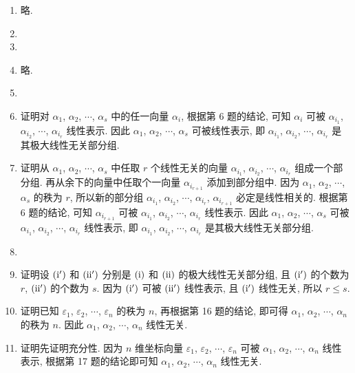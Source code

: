 \documentclass[a4paper, 11pt]{ctexart}
\begin{document}
\begin{enumerate}
        \item %
            略.
        \item %
        \item %
        \item %
            略.
        \item %
        \item %
            {\heiti 证明}\quad 对 $\alpha_1$, $\alpha_2$, $\cdots$, $\alpha_s$ 中的任一向量 $\alpha_i$, 根据{\heiti 第 6 题}的结论, 可知 $\alpha_i$ 可被 $\alpha_{i_1}$, $\alpha_{i_2}$, $\cdots$, $\alpha_{i_r}$ 线性表示.
            因此 $\alpha_1$, $\alpha_2$, $\cdots$, $\alpha_s$ 可被线性表示, 即 $\alpha_{i_1}$, $\alpha_{i_2}$, $\cdots$, $\alpha_{i_r}$ 是其极大线性无关部分组.
        \item %
            {\heiti 证明}\quad 从 $\alpha_1$, $\alpha_2$, $\cdots$, $\alpha_s$ 中任取 $r$ 个线性无关的向量 $\alpha_{i_1}$, $\alpha_{i_2}$, $\cdots$, $\alpha_{i_r}$ 组成一个部分组.
            再从余下的向量中任取个一向量 $\alpha_{i_{r+1}}$ 添加到部分组中. 因为 $\alpha_1$, $\alpha_2$, $\cdots$, $\alpha_s$ 的秩为 $r$, 所以新的部分组 $\alpha_{i_1}$, $\alpha_{i_2}$, $\cdots$, $\alpha_{i_r}$, $\alpha_{i_{r+1}}$ 必定是线性相关的.
            根据{\heiti 第 6 题}的结论, 可知 $\alpha_{i_{r+1}}$ 可被 $\alpha_{i_1}$, $\alpha_{i_2}$, $\cdots$, $\alpha_{i_r}$ 线性表示.
            因此 $\alpha_1$, $\alpha_2$, $\cdots$, $\alpha_s$ 可被 $\alpha_{i_1}$, $\alpha_{i_2}$, $\cdots$, $\alpha_{i_r}$ 线性表示, 即 $\alpha_{i_1}$, $\alpha_{i_2}$, $\cdots$, $\alpha_{i_r}$ 是其极大线性无关部分组.
        \item %
        \item %
            {\heiti 证明}\quad 设 $(\mathrm{\uppercase\expandafter{\romannumeral1'}})$ 和 $(\mathrm{\uppercase\expandafter{\romannumeral2'}})$ 分别是 $(\mathrm{\uppercase\expandafter{\romannumeral1}})$ 和 $(\mathrm{\uppercase\expandafter{\romannumeral2}})$ 的极大线性无关部分组, 且 $(\mathrm{\uppercase\expandafter{\romannumeral1'}})$ 的个数为 $r$, $(\mathrm{\uppercase\expandafter{\romannumeral2'}})$ 的个数为 $s$.
            因为 $(\mathrm{\uppercase\expandafter{\romannumeral1'}})$ 可被 $(\mathrm{\uppercase\expandafter{\romannumeral2'}})$ 线性表示, 且 $(\mathrm{\uppercase\expandafter{\romannumeral1'}})$ 线性无关, 所以 $r \leqslant s$. 
        \item %
            {\heiti 证明}\quad 已知 $\varepsilon_1$, $\varepsilon_2$, $\cdots$, $\varepsilon_n$ 的秩为 $n$, 再根据{\heiti 第 16 题}的结论, 即可得 $\alpha_1$, $\alpha_2$, $\cdots$, $\alpha_n$ 的秩为 $n$.
            因此 $\alpha_1$, $\alpha_2$, $\cdots$, $\alpha_n$ 线性无关.
        \item %
            {\heiti 证明}\quad 先证明充分性. 因为 $n$ 维坐标向量 $\varepsilon_1$, $\varepsilon_2$, $\cdots$, $\varepsilon_n$ 可被 $\alpha_1$, $\alpha_2$, $\cdots$, $\alpha_n$ 线性表示, 根据{\heiti 第 17 题}的结论即可知 $\alpha_1$, $\alpha_2$, $\cdots$, $\alpha_n$ 线性无关.
            

\end{enumerate}
\end{document}
